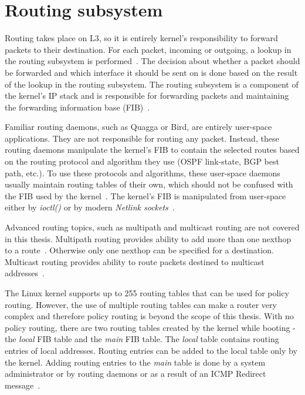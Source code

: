 
\section{Routing subsystem}\label{sec:linux-routing}
Routing takes place on L3, so it is entirely kernel's responsibility to forward packets to their destination.
For each packet, incoming or outgoing, a lookup in the routing subsystem is performed~\cite{linux-kernel-networking}.
The decision about whether a packet should be forwarded and which interface it should be sent on is done based on the result of
the lookup in the routing subsystem.
The routing subsystem is a component of the kernel's IP stack and is responsible for forwarding packets and maintaining
the forwarding information base (FIB)~\cite{linux-kernel-networking}.

Familiar routing daemons, such as Quagga or Bird, are entirely user-space applications.
They are not responsible for routing any packet.
Instead, these routing daemons manipulate the kernel's FIB to
contain the selected routes based on
the routing protocol and algorithm they use (OSPF link-state, BGP best path, etc.).
To use these protocols and algorithms,
these user-space daemons usually maintain routing tables of their own, which should not be confused with the
FIB used by the kernel~\cite{linux-kernel-networking}.
The kernel's FIB is manipulated from user-space
either by {\it{ioctl()}} or by modern {\it{Netlink sockets}}~\cite{networking-subsystem-configuration-interface}.

Advanced routing topics, such as multipath and multicast routing are not covered in this thesis.
Multipath routing provides ability to add more than one nexthop to a route~\cite{linux-kernel-networking}.
Otherwise only one nexthop can be specified for a destination.
Multicast routing provides ability to route packets destined to multicast addresses~\cite{linux-kernel-networking}.

The Linux kernel supports up to 255 routing tables that can be used for policy routing.
However, the use of multiple routing tables can make a router very complex and therefore
policy routing is beyond the scope of this thesis.
With no policy routing, there are two routing tables created by the kernel while booting - the {\it{local}} FIB table
and the {\it{main}} FIB table.
The {\it{local}} table contains routing entries of local addresses.
Routing entries can be added to the local table only by the kernel.
Adding routing entries to the {\it{main}} table is done by a system
administrator or by routing daemons or as a result of an ICMP Redirect message~\cite{linux-kernel-networking}.

